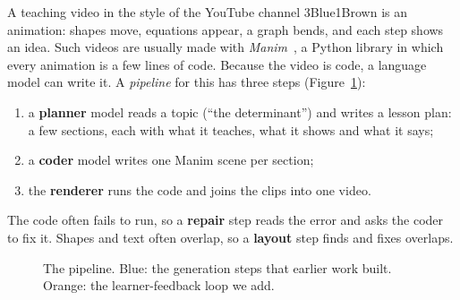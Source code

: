\documentclass[11pt]{article}
\begin{document}
A teaching video in the style of the YouTube channel 3Blue1Brown is an animation: shapes move, equations appear,
a graph bends, and each step shows an idea. Such videos are usually made with \emph{Manim}~\cite{manim}, a Python
library in which every animation is a few lines of code. Because the video is code, a language model can write it.
A \emph{pipeline} for this has three steps (Figure~\ref{fig:pipeline}):
\begin{enumerate}
  \item a \textbf{planner} model reads a topic (``the determinant'') and writes a lesson plan: a few sections, each
  with what it teaches, what it shows and what it says;
  \item a \textbf{coder} model writes one Manim scene per section;
  \item the \textbf{renderer} runs the code and joins the clips into one video.
\end{enumerate}
The code often fails to run, so a \textbf{repair} step reads the error and asks the coder to fix it. Shapes and text
often overlap, so a \textbf{layout} step finds and fixes overlaps.

\begin{figure}[h]
\centering
{}
\caption{The pipeline. Blue: the generation steps that earlier work built. Orange: the learner-feedback loop we
add.}\label{fig:pipeline}
\end{figure}
\end{document}

